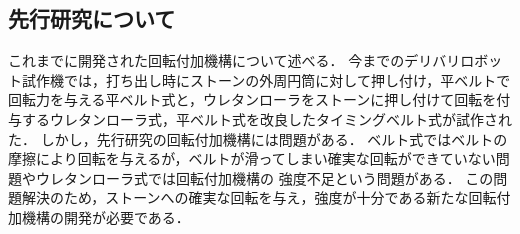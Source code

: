 \documentclass{classes/sice-si}
\begin{document}
\subsection{先行研究について}
これまでに開発された回転付加機構について述べる．
今までのデリバリロボット試作機では，打ち出し時にストーンの外周円筒に対して押し付け，平ベルトで回転力を与える平ベルト式\cite{ref:sankou}と，ウレタンローラをストーンに押し付けて回転を付与するウレタンローラ式，平ベルト式を改良したタイミングベルト式が試作された．
しかし，先行研究の回転付加機構には問題がある．
ベルト式ではベルトの摩擦により回転を与えるが，ベルトが滑ってしまい確実な回転ができていない問題やウレタンローラ式では回転付加機構の
強度不足という問題がある．
この問題解決のため，ストーンへの確実な回転を与え，強度が十分である新たな回転付加機構の開発が必要である．
\end{document}

